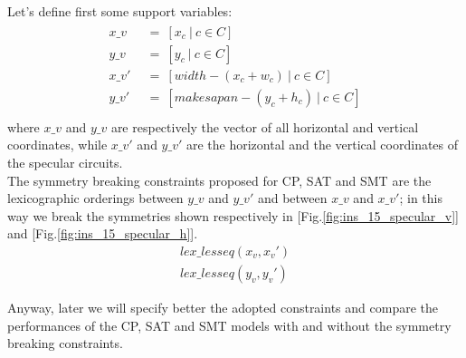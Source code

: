         Let's define first some support variables:
        \begin{align}
            \label{eq:specular_coord}
            \begin{split}
                x\_v\   &\ =\ [x_c\ |\ c \in C]                     \\
                y\_v\   &\ =\ [y_c\ |\ c \in C]                     \\
                x\_v'\  &\ =\ [width - (x_c + w_c)\ |\ c \in C]     \\
                y\_v'\  &\ =\ [makesapan - (y_c + h_c)\ |\ c \in C] \\                
            \end{split} 
        \end{align}
        where $x\_v$ and $y\_v$ are respectively the vector of all horizontal and vertical coordinates,
        while $x\_v'$ and $y\_v'$ are the horizontal and the vertical coordinates of the specular circuits.\\

        The symmetry breaking constraints proposed for CP, SAT and SMT are the lexicographic orderings
        between $y\_v$ and $y\_v'$ and between $x\_v$ and $x\_v'$; in this way we break the 
        symmetries shown respectively in [Fig.\ref{fig:ins_15_specular_v}] and [Fig.\ref{fig:ins_15_specular_h}].
        \begin{align*}
            lex\_lesseq(x_v, x_v') \\
            lex\_lesseq(y_v, y_v')
        \end{align*}

        Anyway, later we will specify better the adopted constraints and compare the performances of the 
        CP, SAT and SMT models with and without the symmetry breaking constraints.

